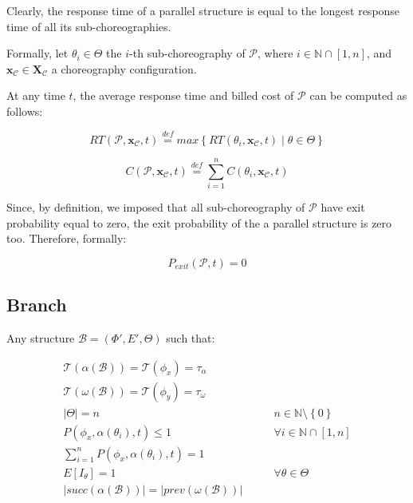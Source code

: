 \documentclass[12pt,a4paper]{report}
\newcommand{\mathDef}{\overset{\textit{def}}{=}}
\newcommand{\N}{\mathbb{N}}
\newcommand{\SetFromOneTo}[1]{\N \cap \left[1,#1\right]}
\begin{document}
Clearly, the response time of a parallel structure is equal to the longest response time of all its sub-choreographies.

Formally, let $\theta_i \in \Theta$ the $i$-th sub-choreography of $\mathcal{P}$, where $i \in \N \cap \left[1,n\right]$, and $\textbf{x}_{\mathcal{C}} \in \textbf{X}_{\mathcal{C}}$ a choreography configuration.

At any time $t$, the average response time and billed cost of $\mathcal{P}$ can be computed as follows:

\begin{equation}
	RT(\mathcal{P},\textbf{x}_{\mathcal{C}}, t) \mathDef max \left\lbrace RT(\theta_i,\textbf{x}_{\mathcal{C}}, t) \mid \theta \in \Theta \right\rbrace 
\end{equation}

\begin{equation}
	C(\mathcal{P},\textbf{x}_{\mathcal{C}}, t) \mathDef \sum_{i = 1}^n C(\theta_i,\textbf{x}_{\mathcal{C}}, t)
\end{equation}

Since, by definition, we imposed that all sub-choreography of $\mathcal{P}$ have exit probability equal to zero, the exit probability of the a parallel structure is zero too. Therefore, formally:

\begin{equation}
	P_{exit}(\mathcal{P}, t) = 0
\end{equation}

\subsection{Branch}

Any structure $\mathcal{B} = (\Phi',E',\Theta)$ such that:

\begin{eqnarray}
	\mathscr{T}(\alpha(\mathcal{B})) = \mathscr{T}(\phi_x) = \tau_{\alpha} \\ \mathscr{T}(\omega(\mathcal{B})) = \mathscr{T}(\phi_y) = \tau_{\omega} \\
	|\Theta| = n  & \qquad n \in \N \setminus \left\{0\right\} \\
	P(\phi_x, \alpha(\theta_i),t) \leq 1 & \qquad \forall i \in \SetFromOneTo{n} \\
	\sum_{i = 1}^n P(\phi_x, \alpha(\theta_i),t) = 1 & \\
	E[I_{\theta}] = 1 & \qquad \forall \theta \in \Theta \\
	|succ(\alpha(\mathcal{B}))| = |prev(\omega(\mathcal{B}))|
\end{eqnarray}
\end{document}

